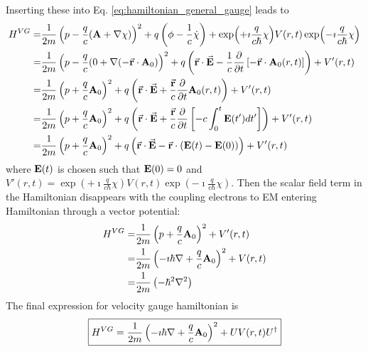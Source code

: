 \documentclass[11pt]{article}
\begin{document}
\begin{itemize}
Inserting these into  Eq. \ref{eq:hamiltonian_general_gauge} leads to
\begin{align*}
H^{VG} =& \frac{1}{2m} \left(p-\frac{q}{c}(\vb A +\nabla \chi) 
    \right)^2  + q\left( \phi  - \frac{1}{c} \dot \chi \right) + \exp(+\imath \frac{q}{c\hbar}\chi)  V(r,t) \exp(-\imath \frac{q}{c\hbar}\chi)\\
=& \frac{1}{2m} \left(p -\frac{q}{c}(0 +\nabla  (-\vec{\vb r}\cdot \vb A_0)
    \right)^2  + q\left( \vec {\vb r} \cdot \vec {\vb E}  
      -\frac{1}{c} \pdv{}{t} \left[  -\vec{\vb r}\cdot \vb A_0(r,t)  \right]\right) +V'(r,t)\\
=& \frac{1}{2m} \left(p+\frac{q}{c}  \vb A_0 \right)^2
    + q\left( \vec {\vb r} \cdot \vec {\vb E} +\frac{\vec{\vb r}}{c} \pdv{}{t}   \vb A_0(r,t) \right) +V'(r,t) \\
= &\frac{1}{2m} \left(p+\frac{q}{c}  \vb A_0 \right)^2 
    + q\left( \vec {\vb r} \cdot \vec {\vb E} +\frac{\vec{\vb r}}{c} \pdv{}{t}  \left[ -c \int_0^t \vb E(t') dt' \right]  \right) +V'(r,t) \\
=& \frac{1}{2m} \left(p+\frac{q}{c}  \vb A_0 \right)^2 
  + q\left( \vec {\vb r} \cdot \vec {\vb E} - \vec{\vb r}  \cdot \left( \vb E(t) - \vb E(0)\right)  \right) +V'(r,t)
\end{align*}
where $\vb E(t)$ is chosen such that  $\vb E(0)=0$ and
 $V'(r,t) =  \exp(+\imath \frac{q}{c\hbar}\chi)  V(r,t) \exp(-\imath \frac{q}{c\hbar}\chi)$.
Then the scalar field term in the Hamiltonian disappears  with the coupling  electrons to EM entering Hamiltonian through a vector potential:
\begin{align*}
H^{VG} =& \frac{1}{2m} \left(p+\frac{q}{c}  \vb A_0 \right)^2 + V'(r,t)\\
=&  \frac{1}{2m} \left(-\imath \hbar \nabla +\frac{q}{c}  \vb A_0 \right)^2 + V(r,t)\\
=&  \frac{1}{2m} \left( -\hbar^2 \nabla^2  \right)
\end{align*}
The final expression for velocity gauge  hamiltonian is
\begin{equation}
  \boxed{
H^{VG} = \frac{1}{2m} \left(-\imath \hbar \nabla +\frac{q}{c}  \vb A_0 \right)^2 + U V(r,t) U^\dag
\label{eq:H_vg}
}  
\end{equation}

\end{itemize}
\end{document}
